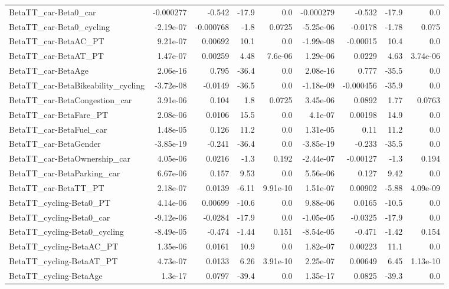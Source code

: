 \begin{tabular}{lrrrrrrrr}
BetaTT_car-Beta0_car & -0.000277 & -0.542 & -17.9 & 0.0 & -0.000279 & -0.532 & -17.9 & 0.0 \\
BetaTT_car-Beta0_cycling & -2.19e-07 & -0.000768 & -1.8 & 0.0725 & -5.25e-06 & -0.0178 & -1.78 & 0.075 \\
BetaTT_car-BetaAC_PT & 9.21e-07 & 0.00692 & 10.1 & 0.0 & -1.99e-08 & -0.00015 & 10.4 & 0.0 \\
BetaTT_car-BetaAT_PT & 1.47e-07 & 0.00259 & 4.48 & 7.6e-06 & 1.29e-06 & 0.0229 & 4.63 & 3.74e-06 \\
BetaTT_car-BetaAge & 2.06e-16 & 0.795 & -36.4 & 0.0 & 2.08e-16 & 0.777 & -35.5 & 0.0 \\
BetaTT_car-BetaBikeability_cycling & -3.72e-08 & -0.0149 & -36.5 & 0.0 & -1.18e-09 & -0.000456 & -35.9 & 0.0 \\
BetaTT_car-BetaCongestion_car & 3.91e-06 & 0.104 & 1.8 & 0.0725 & 3.45e-06 & 0.0892 & 1.77 & 0.0763 \\
BetaTT_car-BetaFare_PT & 2.08e-06 & 0.0106 & 15.5 & 0.0 & 4.1e-07 & 0.00198 & 14.9 & 0.0 \\
BetaTT_car-BetaFuel_car & 1.48e-05 & 0.126 & 11.2 & 0.0 & 1.31e-05 & 0.11 & 11.2 & 0.0 \\
BetaTT_car-BetaGender & -3.85e-19 & -0.241 & -36.4 & 0.0 & -3.85e-19 & -0.233 & -35.5 & 0.0 \\
BetaTT_car-BetaOwnership_car & 4.05e-06 & 0.0216 & -1.3 & 0.192 & -2.44e-07 & -0.00127 & -1.3 & 0.194 \\
BetaTT_car-BetaParking_car & 6.67e-06 & 0.157 & 9.53 & 0.0 & 5.56e-06 & 0.127 & 9.42 & 0.0 \\
BetaTT_car-BetaTT_PT & 2.18e-07 & 0.0139 & -6.11 & 9.91e-10 & 1.51e-07 & 0.00902 & -5.88 & 4.09e-09 \\
BetaTT_cycling-Beta0_PT & 4.14e-06 & 0.00699 & -10.6 & 0.0 & 9.88e-06 & 0.0165 & -10.5 & 0.0 \\
BetaTT_cycling-Beta0_car & -9.12e-06 & -0.0284 & -17.9 & 0.0 & -1.05e-05 & -0.0325 & -17.9 & 0.0 \\
BetaTT_cycling-Beta0_cycling & -8.49e-05 & -0.474 & -1.44 & 0.151 & -8.54e-05 & -0.471 & -1.42 & 0.154 \\
BetaTT_cycling-BetaAC_PT & 1.35e-06 & 0.0161 & 10.9 & 0.0 & 1.82e-07 & 0.00223 & 11.1 & 0.0 \\
BetaTT_cycling-BetaAT_PT & 4.73e-07 & 0.0133 & 6.26 & 3.91e-10 & 2.25e-07 & 0.00649 & 6.45 & 1.13e-10 \\
BetaTT_cycling-BetaAge & 1.3e-17 & 0.0797 & -39.4 & 0.0 & 1.35e-17 & 0.0825 & -39.3 & 0.0 \\

\end{tabular}
